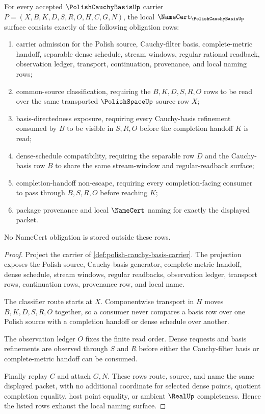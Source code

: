 \begin{theorem}
\label{thm:polish-cauchy-basis-namecert-obligations}
For every accepted $\PolishCauchyBasisUp$ carrier
$P=(X,B,K,D,S,R,O,H,C,G,N)$, the local
$\NameCert_{\PolishCauchyBasisUp}$ surface consists exactly of the following
obligation rows:
\begin{enumerate}
\item carrier admission for the Polish source, Cauchy-filter basis,
complete-metric handoff, separable dense schedule, stream windows, regular
rational readback, observation ledger, transport, continuation, provenance,
and local naming rows;
\item common-source classification, requiring the $B,K,D,S,R,O$ rows to be
read over the same transported $\PolishSpaceUp$ source row $X$;
\item basis-directedness exposure, requiring every Cauchy-basis refinement
consumed by $B$ to be visible in $S,R,O$ before the completion handoff $K$ is
read;
\item dense-schedule compatibility, requiring the separable row $D$ and the
Cauchy-basis row $B$ to share the same stream-window and regular-readback
surface;
\item completion-handoff non-escape, requiring every completion-facing
consumer to pass through $B,S,R,O$ before reaching $K$;
\item package provenance and local $\NameCert$ naming for exactly the
displayed packet.
\end{enumerate}
No NameCert obligation is stored outside these rows.
\end{theorem}
\begin{proof}
Project the carrier of \autoref{def:polish-cauchy-basis-carrier}. The
projection exposes the Polish source, Cauchy-basis generator, complete-metric
handoff, dense schedule, stream windows, regular readbacks, observation
ledger, transport rows, continuation rows, provenance row, and local name.

The classifier route starts at $X$. Componentwise transport in $H$ moves
$B,K,D,S,R,O$ together, so a consumer never compares a basis row over one
Polish source with a completion handoff or dense schedule over another.

The observation ledger $O$ fixes the finite read order. Dense requests and
basis refinements are observed through $S$ and $R$ before either the
Cauchy-filter basis or complete-metric handoff can be consumed.

Finally replay $C$ and attach $G,N$. These rows route, source, and name the
same displayed packet, with no additional coordinate for selected dense
points, quotient completion equality, host point equality, or ambient
$\RealUp$ completeness. Hence the listed rows exhaust the local naming
surface.
\end{proof}

